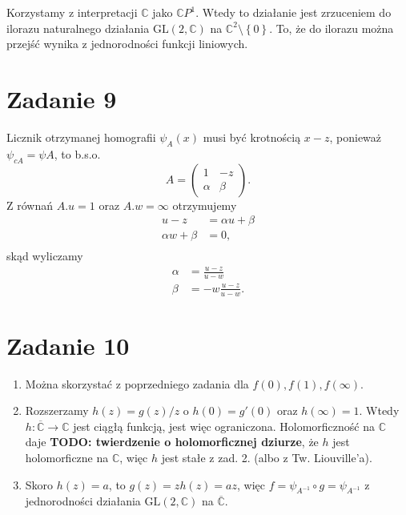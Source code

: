 Korzystamy z interpretacji \( \mathbb{C} \) jako \( \mathbb{C}P^1 \). Wtedy to działanie jest zrzuceniem do ilorazu naturalnego działania \( \mathrm{GL}(2, \mathbb{C}) \) na \( \mathbb{C}^2 \setminus \left\{ 0 \right\} \). To, że do ilorazu można przejść wynika z jednorodności funkcji liniowych.


\section*{Zadanie 9}

Licznik otrzymanej homografii \( \psi_A(x) \) musi być krotnością \( x - z \), ponieważ \( \psi_{cA} = \psi{A} \), to b.s.o.
\[ 
    A =  
    \begin{pmatrix}
        1 & -z \\
        \alpha & \beta
    \end{pmatrix}.
\]
Z równań \( A.u = 1 \) oraz \( A.w = \infty \) otrzymujemy
\begin{align*}
    u - z &= \alpha u + \beta \\
    \alpha w + \beta &= 0, \\
\end{align*}
skąd wyliczamy
\begin{align*}
    \alpha &= \frac{u-z}{u - w} \\ 
    \beta &= -w\frac{u-z}{u-w}.
\end{align*}

\section*{Zadanie 10}

\begin{enumerate}
    \item Można skorzystać z poprzedniego zadania dla \( f(0), f(1), f(\infty) \).

    \item Rozszerzamy \( h(z) = g(z)/z \) o \( h(0) = g'(0) \) oraz \( h(\infty) = 1 \). Wtedy \( h: \overline{\mathbb{C}} \to \mathbb{C} \) jest ciągłą funkcją, jest więc ograniczona. Holomorficzność na \( \mathbb{C} \) daje \textbf{TODO: twierdzenie o holomorficznej dziurze}, że \( h \) jest holomorficzne na \( \mathbb{C} \), więc \( h \) jest stałe z zad. 2. (albo z Tw. Liouville'a).

    \item Skoro \( h(z) = a \), to \( g(z) = zh(z) = az \), więc \( f = \psi_{A^{-1}} \circ g = \psi_{A^{-1}}  \) z jednorodności działania \( \mathrm{GL}(2, \mathbb{C}) \) na \( \overline{\mathbb{C}} \).
\end{enumerate}

